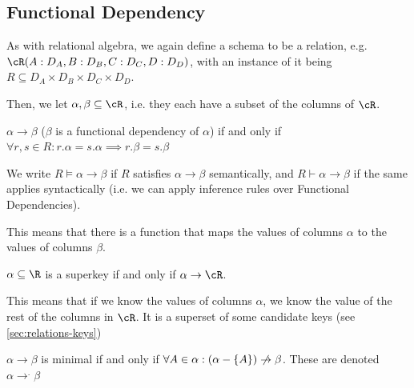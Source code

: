 \subsection{Functional Dependency}
\label{sec:functional-dependency}
As with relational algebra, we again define a schema to be a relation, e.g. $\cR(A:D_A, B:D_B, C:D_C, D: D_D)$,
with an instance of it being $R \subseteq D_A \times D_B \times D_C \times D_D$.

Then, we let $\alpha, \beta \subseteq \cR$, i.e. they each have a subset of the columns of $\cR$.

$\alpha \rightarrow \beta$ ($\beta$ is a functional dependency of $\alpha$) if and only if $\forall r, s \in R : r.\alpha = s.\alpha \implies r.\beta = s.\beta$

We write $R \models \alpha \rightarrow \beta$ if $R$ satisfies $\alpha \rightarrow \beta$ semantically,
and $R \vdash \alpha \rightarrow \beta$ if the same applies syntactically (i.e. we can apply inference rules over Functional Dependencies).

\inlineintuition This means that there is a function that maps the values of columns $\alpha$ to the values of columns $\beta$.


\inlinedefinition $\alpha \subseteq \R$ is a \gls{superkey} if and only if $\alpha \rightarrow \cR$.

\inlineintuition This means that if we know the values of columns $\alpha$, we know the value of the rest of the columns in $\cR$.
It is a superset of some candidate keys (see \ref{sec:relations-keys})


\inlinedefinition $\alpha \rightarrow \beta$ is minimal if and only if $\forall A \in \alpha : (\alpha - \{ A \}) \centernot{\rightarrow} \beta$.
These are denoted $\alpha \rightarrow ^.\beta$
